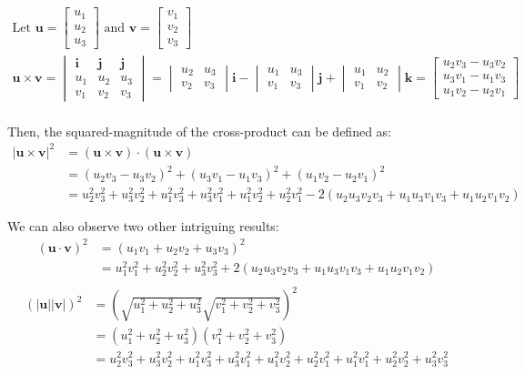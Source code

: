\begin{gather*}
\text{Let } \bm{u} = \begin{bmatrix}u_1\\u_2\\u_3\end{bmatrix} \text{ and } \bm{v} = \begin{bmatrix}v_1\\v_2\\v_3\end{bmatrix} \\
\bm{u} \times \bm{v} = \begin{vmatrix}
\bm{i} & \bm{j} & \bm{j}\\
u_1 & u_2 & u_3 \\
v_1 & v_2 & v_3
\end{vmatrix} = \begin{vmatrix}
u_2 & u_3 \\
v_2 & v_3
\end{vmatrix}\bm{i} - \begin{vmatrix}
u_1 & u_3 \\
v_1 & v_3
\end{vmatrix}\bm{j} + \begin{vmatrix}
u_1 & u_2 \\
v_1 & v_2
\end{vmatrix}\bm{k} = \begin{bmatrix}u_2v_3 - u_3v_2\\u_3v_1 - u_1v_3\\u_1v_2 - u_2v_1\end{bmatrix}\\
\end{gather*}

Then, the squared-magnitude of the cross-product can be defined as:
\begin{align*}
|\bm{u} \times \bm{v}|^2 &= (\bm{u} \times \bm{v}) \cdot (\bm{u} \times \bm{v}) \\
&= (u_2v_3 - u_3v_2)^2 + (u_3v_1 - u_1v_3)^2 + (u_1v_2 - u_2v_1)^2 \\
&= u_2^2v_3^2 + u_3^2v_2^2 + u_1^2v_3^2 + u_3^2v_1^2 + u_1^2v_2^2 + u_2^2v_1^2 - 2(u_2u_3v_2v_3 + u_1u_3v_1v_3 + u_1u_2v_1v_2)
\end{align*}

We can also observe two other intriguing results:
\begin{align*}
(\bm{u} \cdot \bm{v})^2 &= (u_1v_1 + u_2v_2 + u_3v_3)^2 \\
&= u_1^2v_1^2 + u_2^2v_2^2 + u_3^2v_3^2 + 2(u_2u_3v_2v_3 + u_1u_3v_1v_3 + u_1u_2v_1v_2) \\
\end{align*}
\begin{align*}
(|\bm{u}||\bm{v}|)^2 &= (\sqrt{u_1^2 + u_2^2 + u_3^2}\sqrt{v_1^2 + v_2^2 + v_3^2})^2 \\
&= (u_1^2 + u_2^2 + u_3^2)(v_1^2 + v_2^2 + v_3^2) \\
&= u_2^2v_3^2 + u_3^2v_2^2 + u_1^2v_3^2 + u_3^2v_1^2 + u_1^2v_2^2 + u_2^2v_1^2 + u_1^2v_1^2 + u_2^2v_2^2 + u_3^2v_3^2
\end{align*}

